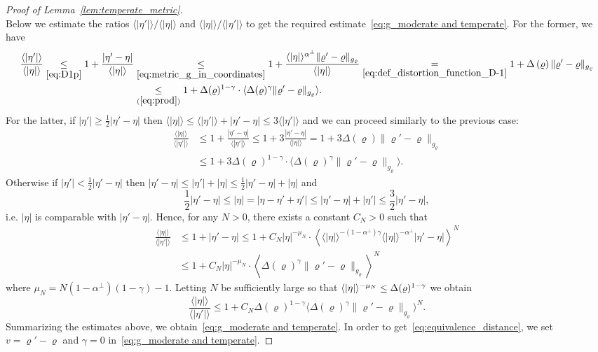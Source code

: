 \documentclass[10pt]{amsart}
\theoremstyle{definition}\newtheorem{defi}[theo]{Definition}\newtheorem{rema}[theo]{Remark}\newtheorem{exam}[theo]{Example}\newtheorem{exem}[theo]{Example}\newtheorem{nota}[theo]{Notation}
\newcommand*\ineq[1]{\underset{(#1)}{\leq}}
\begin{document}
\begin{proof}[Proof of Lemma~\ref{lem:temperate_metric}]
\begin{equation}
\end{equation}
Below we estimate the ratios $\langle|\eta'|\rangle/\langle|\eta|\rangle$ and $\langle|\eta|\rangle/\langle|\eta'|\rangle$ to get the required estimate~\eqref{eq:g_moderate and temperate}. For the former, we have
\begin{align}
\frac{\langle|\eta'|\rangle}{\langle|\eta|\rangle}\underset{\eqref{eq:D1p}}{\leq}1+\frac{\left|\eta'-\eta\right|}{\langle|\eta|\rangle} & \underset{\eqref{eq:metric_g_in_coordinates}}{\leq}1+\frac{\langle\left|\eta\right|\rangle^{\alpha^{\perp}}\|\varrho'-\varrho\|_{g_{\varrho}}}{\left\langle \left|\eta\right|\right\rangle }\underset{\eqref{eq:def_distortion_function_D-1}}{=} 1+\Delta\left(\varrho\right)\|\varrho'-\varrho\|_{g_{\varrho}}\label{eq:res1-1}
\\
& \ineq{\ref{eq:prod}}1+\Delta(\varrho)^{1-\gamma}\cdot\langle\Delta(\varrho)^{\gamma}\|\varrho'-\varrho\|_{g_{\varrho}}\rangle.
\end{align}
For the latter, if $|\eta'|\ge\frac{1}{2}|\eta'-\eta|$ then $\langle|\eta|\rangle\leq\langle|\eta'|\rangle+|\eta'-\eta|\le3\langle|\eta'|\rangle$ and we can proceed similarly to the previous case:
\begin{align*}
\frac{\langle|\eta|\rangle}{\langle|\eta'|\rangle} &\leq1+\frac{\left|\eta'-\eta\right|}{\langle|\eta'|\rangle}\leq1+3\frac{\left|\eta'-\eta\right|}{\langle|\eta|\rangle}=1+3\Delta\left(\varrho\right)\|\varrho'-\varrho\|_{g_{\varrho}}\\
&\le1+3\Delta(\varrho)^{1-\gamma}\cdot\langle\Delta(\varrho)^{\gamma}\|\varrho'-\varrho\|_{g_{\varrho}}\rangle.
\end{align*}
Otherwise if $|\eta'|<\frac{1}{2}|\eta'-\eta|$ then $|\eta'-\eta|\leq|\eta'|+|\eta|\leq\frac{1}{2}|\eta'-\eta|+|\eta|$ and
\[
\frac{1}{2}|\eta'-\eta|\leq\left|\eta\right|=|\eta-\eta'+\eta'|\leq|\eta'-\eta|+|\eta'|\leq\frac{3}{2}|\eta'-\eta|,
\]
i.e. $|\eta|$ is comparable with $|\eta'-\eta|$. Hence, for any $N>0$, there exists a constant $C_{N}>0$ such that
\[
\begin{aligned}\frac{\langle|\eta|\rangle}{\langle|\eta'|\rangle} & \leq1+|\eta'-\eta|\leq1+C_{N}|\eta|^{-\mu_{N}}\cdot\left\langle \langle|\eta|\rangle^{-(1-\alpha^{\perp})\gamma}\langle|\eta|\rangle^{-\alpha^{\perp}}|\eta'-\eta|\right\rangle ^{N}\\
& \leq1+C_{N}|\eta|^{-\mu_{N}}\cdot\left\langle \Delta\left(\varrho\right)^{\gamma}\|\varrho'-\varrho\|_{g_{\varrho}}\right\rangle ^{N}
\end{aligned}
\]
where $\mu_{N}=N(1-\alpha^{\perp})(1-\gamma)-1.$ Letting $N$ be sufficiently large so that $\langle |\eta|\rangle ^{-\mu_{N}}\linebreak\leq\Delta(\varrho)^{1-\gamma}$ we obtain
\[
\frac{\langle|\eta|\rangle}{\langle|\eta'|\rangle}\le1+C_{N}\Delta(\varrho)^{1-\gamma}\langle\Delta\left(\varrho\right)^{\gamma}\|\varrho'-\varrho\|_{g_{\varrho}}\rangle^{N}.
\]
Summarizing the estimates above, we obtain~\eqref{eq:g_moderate and temperate}. In order to get~\eqref{eq:equivalence_distance}, we set $v=\varrho'-\varrho$ and $\gamma=0$ in~\eqref{eq:g_moderate and temperate}.
\end{proof}
\end{document}
